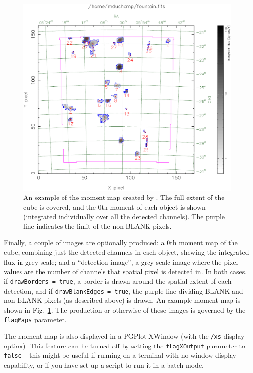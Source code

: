 
\begin{figure}[!t]
\begin{center}
\includegraphics[width=\textwidth]{example_moment_map}
\end{center}
\caption{\footnotesize An example of the moment map created by
  \duchamp. The full extent of the cube is covered, and the 0th moment
  of each object is shown (integrated individually over all the
  detected channels). The purple line indicates the limit of the
  non-BLANK pixels.}
\label{fig-moment}
\end{figure}

Finally, a couple of images are optionally produced: a 0th moment map
of the cube, combining just the detected channels in each object,
showing the integrated flux in grey-scale; and a ``detection image'',
a grey-scale image where the pixel values are the number of channels
that spatial pixel is detected in. In both cases, if
\texttt{drawBorders = true}, a border is drawn around the spatial
extent of each detection, and if \texttt{drawBlankEdges = true}, the
purple line dividing BLANK and non-BLANK pixels (as described above)
is drawn. An example moment map is shown in Fig.~\ref{fig-moment}.
The production or otherwise of these images is governed by the
\texttt{flagMaps} parameter.

The moment map is also displayed in a PGPlot XWindow (with the
\texttt{/xs} display option). This feature can be turned off by
setting the \texttt{flagXOutput} parameter to \texttt{false} -- this
might be useful if running \duchamp on a terminal with no window
display capability, or if you have set up a script to run it in a
batch mode.

